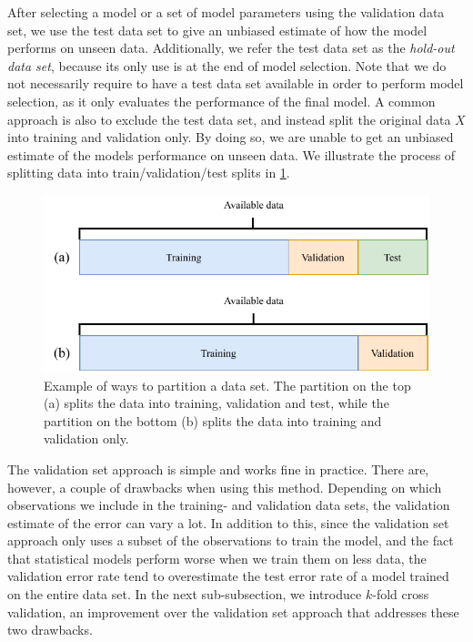 After selecting a model or a set of model parameters using the validation data set, we use the test data set to give an unbiased estimate of how the model performs on unseen data. Additionally, we refer the test data set as the \textit{hold-out data set}, because its only use is at the end of model selection. Note that we do not necessarily require to have a test data set available in order to perform model selection, as it only evaluates the performance of the final model. A common approach is also to exclude the test data set, and instead split the original data $X$ into training and validation only. By doing so, we are unable to get an unbiased estimate of the models performance on unseen data. We illustrate the process of splitting data into train/validation/test splits in \cref{fig:train-val-test-splits}.
\begin{figure}[H]
    \centering
    \includegraphics[width=\textwidth]{thesis/figures/train-val-test-splits_cropped.pdf}
    \caption{Example of ways to partition a data set. The partition on the top (a) splits the data into training, validation and test, while the partition on the bottom (b) splits the data into training and validation only.}
    \label{fig:train-val-test-splits}
\end{figure}

The validation set approach is simple and works fine in practice. There are, however, a couple of drawbacks when using this method. Depending on which observations we include in the training- and validation data sets, the validation estimate of the error can vary a lot. In addition to this, since the validation set approach only uses a subset of the observations to train the model, and the fact that statistical models perform worse when we train them on less data, the validation error rate tend to overestimate the test error rate of a model trained on the entire data set. In the next sub-subsection, we introduce $k$-fold cross validation, an improvement over the validation set approach that addresses these two drawbacks.

